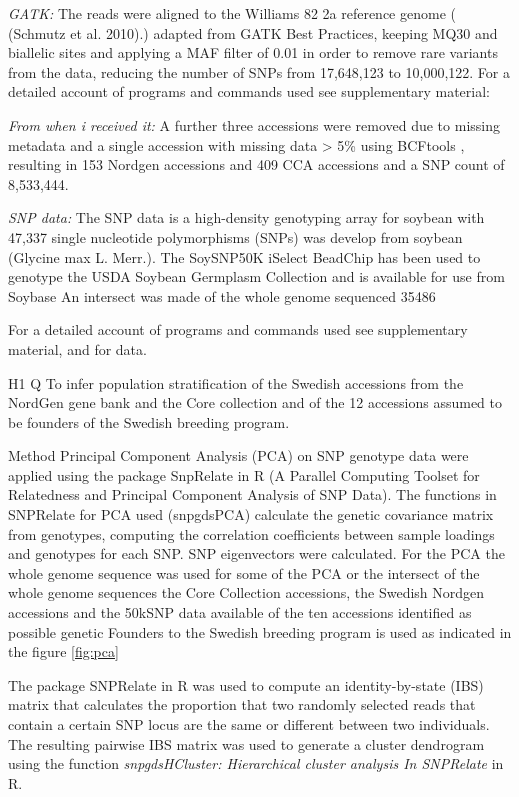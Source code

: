 \documentclass[9pt, onecolumn,twoside]{gsajnl}
\begin{document}
\textit{GATK:} The reads were aligned to the Williams 82 2a reference genome ( (Schmutz et al. 2010).) adapted from GATK Best Practices, keeping MQ30 and biallelic sites and applying a MAF filter of 0.01 in order to remove rare variants from the data, reducing the number of SNPs from 17,648,123 to 10,000,122. 
For a detailed account of programs and commands used see supplementary material:  

\textit{From when i received it:} A further three accessions were removed due to missing metadata and a single accession with missing data > 5\% using BCFtools \cite{bcftools}, resulting in 153 Nordgen accessions and 409 CCA accessions and a SNP count of 8,533,444. 

\textit{SNP data:} The SNP data is a high-density genotyping array for soybean with 47,337 single nucleotide polymorphisms (SNPs) was develop from soybean (Glycine max L. Merr.). The SoySNP50K iSelect BeadChip has been used to genotype the USDA Soybean Germplasm Collection and is available for use from Soybase
 An intersect was made of the whole genome sequenced
35486

For a detailed account of programs and commands used see supplementary material,  and  for data. 

H1
Q 
To infer population stratification of the Swedish accessions from the NordGen gene bank and the Core collection and of the 12 accessions assumed to be founders of the Swedish breeding program.

Method
Principal Component Analysis (PCA) on SNP genotype data were applied using the package SnpRelate in R (A Parallel Computing Toolset for Relatedness and Principal Component Analysis of SNP Data). The functions in SNPRelate for PCA used (snpgdsPCA) calculate the genetic covariance matrix from genotypes, computing the correlation coefficients between sample loadings and genotypes for each SNP. SNP eigenvectors were calculated. For the PCA the whole genome sequence was used for some of the PCA or the  intersect of the whole genome sequences the Core Collection accessions, the Swedish Nordgen accessions and the 50kSNP data available of the ten accessions identified as possible genetic Founders to the Swedish breeding program is used as indicated in the figure \ref{fig:pca}

The package SNPRelate in R was used to compute an identity-by-state (IBS) matrix that calculates the proportion that two randomly selected reads that contain a certain SNP locus are the same or different between two individuals. The resulting pairwise IBS matrix was used to generate a cluster dendrogram using the function \textit{snpgdsHCluster: Hierarchical cluster analysis In SNPRelate }in R. 
\end{document}
